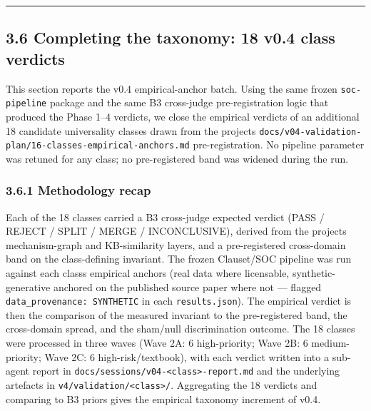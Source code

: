 \documentclass[
  11pt]{article}
\begin{document}
\begin{center}\rule{0.5\linewidth}{0.5pt}\end{center}

\subsection{3.6 Completing the taxonomy: 18 v0.4 class
verdicts}\label{36-completing-the-taxonomy-18-v04-class-verdicts}


This section reports the v0.4 empirical-anchor batch. Using the same
frozen \texttt{soc-pipeline} package and the same B3 cross-judge
pre-registration logic that produced the Phase 1--4 verdicts, we close
the empirical verdicts of an additional 18 candidate universality
classes drawn from the project\textquotesingle s
\texttt{docs/v04-validation-plan/16-classes-empirical-anchors.md}
pre-registration. No pipeline parameter was retuned for any class; no
pre-registered band was widened during the run.

\subsubsection{3.6.1 Methodology recap}\label{361-methodology-recap}

Each of the 18 classes carried a B3 cross-judge expected verdict
(PASS / REJECT / SPLIT / MERGE / INCONCLUSIVE), derived from the
project\textquotesingle s mechanism-graph and KB-similarity layers, and
a pre-registered cross-domain band on the class-defining invariant. The
frozen Clauset/SOC pipeline was run against each class\textquotesingle s
empirical anchors (real data where licensable, synthetic-generative
anchored on the published source paper where not --- flagged
\texttt{data\_provenance: SYNTHETIC} in each \texttt{results.json}). The
empirical verdict is then the comparison of the measured invariant to
the pre-registered band, the cross-domain spread, and the sham/null
discrimination outcome. The 18 classes were processed in three waves
(Wave 2A: 6 high-priority; Wave 2B: 6 medium-priority; Wave 2C: 6
high-risk/textbook), with each verdict written into a sub-agent report
in \texttt{docs/sessions/v04-<class>-report.md} and the underlying
artefacts in \texttt{v4/validation/<class>/}. Aggregating the 18
verdicts and comparing to B3 priors gives the empirical taxonomy
increment of v0.4.
\end{document}
